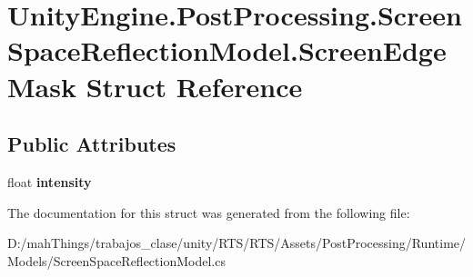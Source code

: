 \hypertarget{struct_unity_engine_1_1_post_processing_1_1_screen_space_reflection_model_1_1_screen_edge_mask}{}\section{Unity\+Engine.\+Post\+Processing.\+Screen\+Space\+Reflection\+Model.\+Screen\+Edge\+Mask Struct Reference}
\label{struct_unity_engine_1_1_post_processing_1_1_screen_space_reflection_model_1_1_screen_edge_mask}
\subsection*{Public Attributes}
\begin{DoxyCompactItemize}
\item 
\mbox{\label{struct_unity_engine_1_1_post_processing_1_1_screen_space_reflection_model_1_1_screen_edge_mask_a2b7c55a5cf534281a9e4acd398ecf805}} 
float {\bfseries intensity}
\end{DoxyCompactItemize}


The documentation for this struct was generated from the following file\+:\begin{DoxyCompactItemize}
\item 
D\+:/mah\+Things/trabajos\+\_\+clase/unity/\+R\+T\+S/\+R\+T\+S/\+Assets/\+Post\+Processing/\+Runtime/\+Models/Screen\+Space\+Reflection\+Model.\+cs\end{DoxyCompactItemize}
